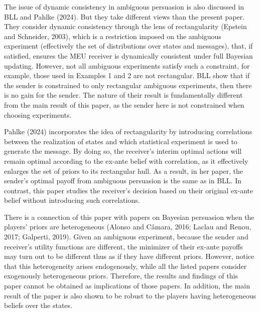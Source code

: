 \documentclass[12pt,a4paper]{article}
\theoremstyle{definition}
\theoremstyle{remark}
\newenvironment{original}{%
    \par\medskip\noindent%
    \begin{tcolorbox}[%
        colback=white,%
        colframe=black!50,%
        title=\textbf{Original English},%
        fonttitle=\small\bfseries,%
        left=0pt, right=0pt, top=2pt, bottom=2pt,%
        boxrule=0.5pt,%
        arc=0pt,%
        outer arc=0pt%
    ]%
    \small%
}{%
    \end{tcolorbox}%
}
\begin{document}
\begin{original}
The issue of dynamic consistency in ambiguous persuasion is also discussed in BLL and Pahlke (2024). But they take different views than the present paper. They consider dynamic consistency through the lens of rectangularity (Epstein and Schneider, 2003), which is a restriction imposed on the ambiguous experiment (effectively the set of distributions over states and messages), that, if satisfied, ensures the MEU receiver is dynamically consistent under full Bayesian updating. However, not all ambiguous experiments satisfy such a constraint, for example, those used in Examples 1 and 2 are not rectangular. BLL show that if the sender is constrained to only rectangular ambiguous experiments, then there is no gain for the sender. The nature of their result is fundamentally different from the main result of this paper, as the sender here is not constrained when choosing experiments.

Pahlke (2024) incorporates the idea of rectangularity by introducing correlations between the realization of states and which statistical experiment is used to generate the message. By doing so, the receiver's interim optimal actions will remain optimal according to the ex-ante belief with correlation, as it effectively enlarges the set of priors to its rectangular hull. As a result, in her paper, the sender's optimal payoff from ambiguous persuasion is the same as in BLL. In contrast, this paper studies the receiver's decision based on their original ex-ante belief without introducing such correlations.

There is a connection of this paper with papers on Bayesian persuasion when the players' priors are heterogeneous (Alonso and C\^{a}mara, 2016; Laclau and Renou, 2017; Galperti, 2019). Given an ambiguous experiment, because the sender and receiver's utility functions are different, the minimizer of their ex-ante payoffs may turn out to be different thus as if they have different priors. However, notice that this heterogeneity arises endogenously, while all the listed papers consider exogenously heterogeneous priors. Therefore, the results and findings of this paper cannot be obtained as implications of those papers. In addition, the main result of the paper is also shown to be robust to the players having heterogeneous beliefs over the states.
\end{original}
\end{document}
